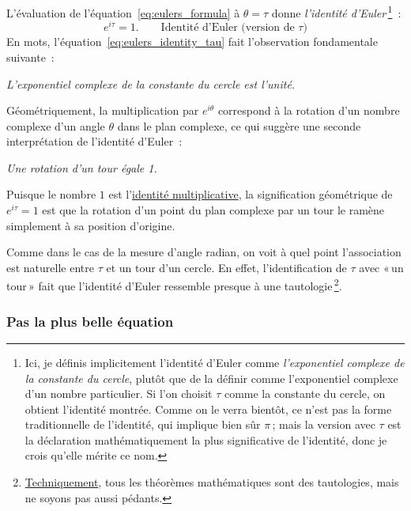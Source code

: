 L'évaluation de l'équation~\eqref{eq:eulers_formula} à $\theta = \tau$ donne \emph{l'identité d'Euler}\,\footnote{Ici, je définis implicitement l'identité d'Euler comme \emph{l'exponentiel complexe de la constante du cercle}, plutôt que de la définir comme l'exponentiel complexe d'un nombre particulier. Si l'on choisit $\tau$ comme la constante du cercle, on obtient l'identité montrée. Comme on le verra bientôt, ce n'est pas la forme traditionnelle de l'identité, qui implique bien sûr $\pi$\,; mais la version avec $\tau$ est la déclaration mathématiquement la plus significative de l'identité, donc je crois qu'elle mérite ce nom.}~:
\begin{equation}
\label{eq:eulers_identity_tau}
e^{i\tau} = 1. \qquad\mbox{Identité d'Euler (version de $\tau$)}
\end{equation}
En mots, l'équation~\eqref{eq:eulers_identity_tau} fait l'observation fondamentale suivante~:

\begin{center}
\emph{L'exponentiel complexe de la constante du cercle est l'unité.}
\end{center}

Géométriquement, la multiplication par $e^{i\theta}$ correspond à la rotation d'un nombre complexe d'un angle $\theta$ dans le plan complexe, ce qui suggère une seconde interprétation de l'identité d'Euler~:

\begin{center}
\emph{Une rotation d'un tour égale 1.}
\end{center}

\noindent Puisque le nombre $1$ est l'\href{https://fr.wikipedia.org/wiki/%C3%89l%C3%A9ment_neutre}{identité multiplicative}, la signification géométrique de $e^{i\tau} = 1$ est que la rotation d'un point du plan complexe par un tour le ramène simplement à sa position d'origine.

Comme dans le cas de la mesure d'angle radian, on voit à quel point l'association est naturelle entre $\tau$ et un tour d'un cercle. En effet, l'identification de $\tau$ avec «\,un tour\,» fait que l'identité d'Euler ressemble presque à une tautologie\,\footnote{\href{https://bit.ly/32mB2CF}{Techniquement}, tous les théorèmes mathématiques sont des tautologies, mais ne soyons pas aussi pédants.}.

    \subsubsection{Pas la plus belle équation} %
    \label{sec:not_the_most_beautiful_equation}

